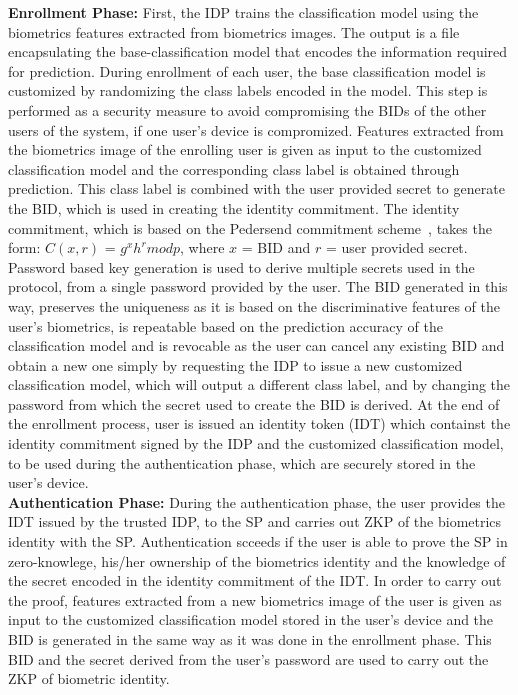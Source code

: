 \documentclass[10pt]{article}
\begin{document}
\textbf{Enrollment Phase:}
First, the IDP trains the classification model using the biometrics features extracted from biometrics images. The output is a 
file encapsulating the base-classification model that encodes the information required for prediction. 
During enrollment of each user, the base classification model is customized by randomizing the class labels encoded in the 
model. This step is performed as a security measure to avoid compromising the BIDs of the other users of the system, if one user's device is 
compromized.
Features extracted from the biometrics image of the enrolling user is given as input to the customized classification model and the corresponding 
class label is obtained through prediction. This class label is combined with the user provided secret to generate the BID, which is used in creating 
the identity commitment. The identity commitment, which is based on the Pedersend commitment scheme~\cite{pedersenCommitment}, takes the form: $C (x, 
r)$ = $g^{x}h^{r} mod p$, where $x$ = BID and $r$ = user provided secret. Password based key generation is used to derive multiple secrets used in 
the protocol, from a single password provided by the user. The BID generated in this way, preserves the uniqueness as it is based on the 
discriminative features of the user's biometrics, is repeatable based on the prediction accuracy of the classification model and is revocable as the 
user can cancel any existing BID and obtain a new one simply by requesting the IDP to issue a new customized classification model, which will output 
a different class label, and by changing the password from which the secret used to create the BID is derived.
At the end of the enrollment process, user is issued an identity token (IDT) which containst the identity commitment signed by the IDP and the 
customized classification model, to be used during the authentication phase, which are securely stored in the user's device.\\

\textbf{Authentication Phase:}
During the authentication phase, the user provides the IDT issued by the trusted IDP, to the SP and carries out ZKP of the biometrics identity with 
the SP.
Authentication scceeds if the user is able to prove the SP in zero-knowlege, his/her ownership of the biometrics identity and the knowledge of 
the secret encoded in the identity commitment of the IDT. In order to carry out the proof, features extracted from a new biometrics image of the user 
is given as input to the customized classification model stored in the user's device and the BID is generated in the same way as it was done in the 
enrollment phase. This BID and the secret derived from the user's password are used to carry out the ZKP of biometric identity.\\
\end{document}
